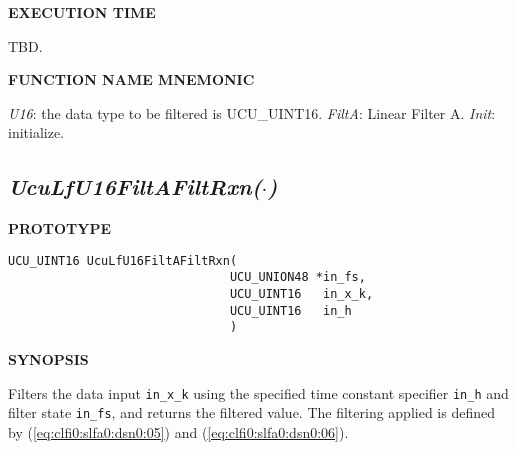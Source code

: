 \noindent\textbf{EXECUTION TIME}
\begin{list}{}{\setlength{\leftmargin}{0.25in}\setlength{\topsep}{0.0in}}
\item TBD.
\end{list}
\vspace{2.8ex}

\noindent\textbf{FUNCTION NAME MNEMONIC}
\begin{list}{}{\setlength{\leftmargin}{0.25in}\setlength{\topsep}{0.0in}}
\item \emph{U16}:    the data type to be filtered is UCU\_UINT16.
      \emph{FiltA}:  Linear Filter A.
      \emph{Init}:   initialize.
\end{list}

\subsection[\emph{UcuLfU16FiltAFiltRxn(\protect\mbox{\protect$\cdot$})}]
           {\emph{UcuLfU16FiltAFiltRxn(\protect\mbox{\protect\boldmath $\cdot$})}}
\label{clfi0:slaf0}

%

\noindent\textbf{PROTOTYPE}
\begin {list}{}{\setlength{\leftmargin}{0.25in}\setlength{\topsep}{0.0in}}
\item
\begin{verbatim}
UCU_UINT16 UcuLfU16FiltAFiltRxn(
                               UCU_UNION48 *in_fs, 
                               UCU_UINT16   in_x_k, 
                               UCU_UINT16   in_h
                               )
\end{verbatim}
\end{list}
\vspace{2.8ex}

\noindent\textbf{SYNOPSIS}
\begin{list}{}{\setlength{\leftmargin}{0.25in}\setlength{\topsep}{0.0in}}
\item Filters the data input \texttt{in\_x\_k} using the specified
      time constant specifier \texttt{in\_h} and filter state
      \texttt{in\_fs}, and returns the filtered value.
      The filtering applied is defined by 
      (\ref{eq:clfi0:slfa0:dsn0:05}) and (\ref{eq:clfi0:slfa0:dsn0:06}).
\end{list}
\vspace{2.8ex}

